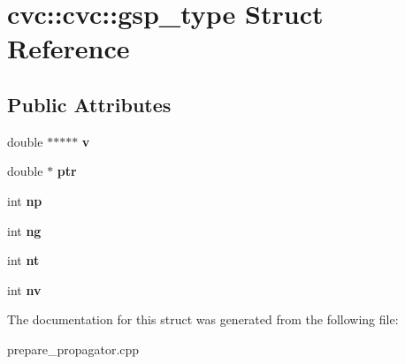\hypertarget{structcvc_1_1cvc_1_1gsp__type}{\section{cvc\-:\-:cvc\-:\-:gsp\-\_\-type Struct Reference}
\label{structcvc_1_1cvc_1_1gsp__type}
}
\subsection*{Public Attributes}
\begin{DoxyCompactItemize}
\item 
\hypertarget{structcvc_1_1cvc_1_1gsp__type_a8a739b24cb7308ae8ad7f3184ee441be}{double $\ast$$\ast$$\ast$$\ast$$\ast$ {\bfseries v}}\label{structcvc_1_1cvc_1_1gsp__type_a8a739b24cb7308ae8ad7f3184ee441be}

\item 
\hypertarget{structcvc_1_1cvc_1_1gsp__type_afbcb32e2b0a4fa0e0756fc13762a66a2}{double $\ast$ {\bfseries ptr}}\label{structcvc_1_1cvc_1_1gsp__type_afbcb32e2b0a4fa0e0756fc13762a66a2}

\item 
\hypertarget{structcvc_1_1cvc_1_1gsp__type_a88d4f457680066090291e18436f9d837}{int {\bfseries np}}\label{structcvc_1_1cvc_1_1gsp__type_a88d4f457680066090291e18436f9d837}

\item 
\hypertarget{structcvc_1_1cvc_1_1gsp__type_acf5b22ae0fa453b1183325564ecd301c}{int {\bfseries ng}}\label{structcvc_1_1cvc_1_1gsp__type_acf5b22ae0fa453b1183325564ecd301c}

\item 
\hypertarget{structcvc_1_1cvc_1_1gsp__type_a9aa57d9f698b38fcf32e62b86511a0a5}{int {\bfseries nt}}\label{structcvc_1_1cvc_1_1gsp__type_a9aa57d9f698b38fcf32e62b86511a0a5}

\item 
\hypertarget{structcvc_1_1cvc_1_1gsp__type_a19d56a46a1f9786a8529d9627120d546}{int {\bfseries nv}}\label{structcvc_1_1cvc_1_1gsp__type_a19d56a46a1f9786a8529d9627120d546}

\end{DoxyCompactItemize}


The documentation for this struct was generated from the following file\-:\begin{DoxyCompactItemize}
\item 
prepare\-\_\-propagator.\-cpp\end{DoxyCompactItemize}
